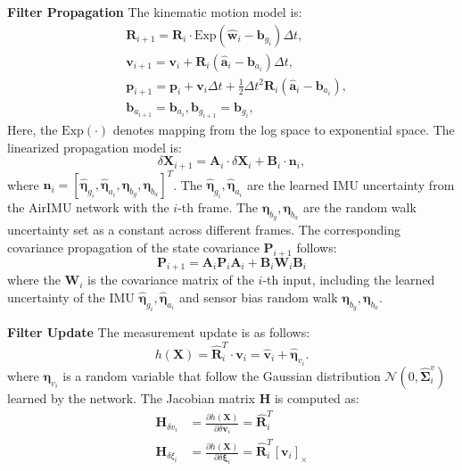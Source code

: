 \textbf{Filter Propagation}
The kinematic motion model is:
\begin{equation}
    \begin{split}
    \label{eq:airio:integrate}
        &\mathbf{R}_{i+1} = \mathbf{R}_i \cdot \text{Exp}(\hat{\mathbf{w}}_i - \mathbf{b}_{g_i})  \Delta t, \\
        &\mathbf{v}_{i+1} = \mathbf{v}_i + \mathbf{R}_i (\hat{\mathbf{a}}_i - \mathbf{b}_{a_i}) {\Delta}t, \\
        &\mathbf{p}_{i+1} = \mathbf{p}_i + \mathbf{v}_i \Delta t + \frac{1}{2} \Delta t^2 \mathbf{R}_i( \hat{\mathbf{a}}_i - \mathbf{b}_{a_i}), \\
        &\mathbf{b}_{a_{i+1}} = \mathbf{b}_{a_{i}}, \mathbf{b}_{g_{i+1}} = \mathbf{b}_{g_{i}},
    \end{split}
\end{equation}
Here, the $\text{Exp}(\cdot)$ denotes mapping from the log space to exponential space.
The linearized propagation model is:
\begin{equation}
\delta \mathbf{X}_{i+1} = \mathbf{A}_i \cdot \delta \mathbf{X}_i + \mathbf{B}_i \cdot \mathbf{n}_i,
\end{equation}
where $\mathbf{n}_i = [ \hat{\boldsymbol{\eta}}_{g_i}, \hat{\boldsymbol{\eta}}_{a_i}, \boldsymbol{\eta}_{b_{g}}, \boldsymbol{\eta}_{b_{a}}]^T$. The $\hat{\boldsymbol{\eta}}_{g_i}, \hat{\boldsymbol{\eta}}_{a_i}$ are the learned IMU uncertainty from the AirIMU network \cite{qiu2023airimu}
with the $i$-th frame.
The $\boldsymbol{\eta}_{b_{g}}, \boldsymbol{\eta}_{b_{a}}$ are the random walk uncertainty set as a constant across different frames. The corresponding covariance propagation of the state covariance $\mathbf{P}_{i+1}$ follows:
\begin{equation}
\mathbf{P}_{i+1} = \mathbf{A}_i \mathbf{P}_{i} \mathbf{A}_i + \mathbf{B}_i \mathbf{W}_i \mathbf{B}_i
\end{equation}
where the $\mathbf{W}_i$ is the covariance matrix of the $i$-th input, including the learned uncertainty of the IMU $ \hat{\boldsymbol{\eta}}_{g_i}, \hat{\boldsymbol{\eta}}_{a_i}$  and sensor bias random walk $\boldsymbol{\eta}_{b_{g}}, \boldsymbol{\eta}_{b_{a}}$.

\textbf{Filter Update}
The measurement update is as follows:
\begin{equation}
    h(\mathbf{X}) = \hat{\mathbf{R}}_i^T \cdot \mathbf{v}_i =  \hat{\mathbf{v}}_i + \hat{ \boldsymbol{\eta}}_{v_i}.
\end{equation}
where $\boldsymbol{\eta}_{v_i}$ is a random variable that follow the Gaussian distribution $\mathcal{N}(0, \hat{\boldsymbol{\Sigma}}^v_i )$ learned by the network. The Jacobian matrix $\mathbf{H}$ is computed as:
\begin{equation}
\begin{split}
\mathbf{H}_{\delta v_i} &= \frac{\partial h(\mathbf{X})}{\partial \delta \mathbf{v}_i} =  \hat{\mathbf{R}}_i^T\\
\mathbf{H}_{\delta \xi_i} &= \frac{\partial h(\mathbf{X})}{\partial \delta \boldsymbol{\xi}_i} = \hat{\mathbf{R}}_i^T [\mathbf{v}_i]_\times
\end{split}
\end{equation}


